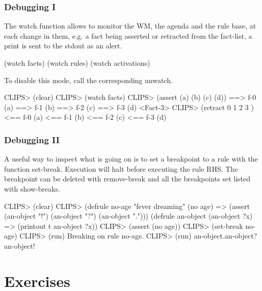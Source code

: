 \documentclass[xcolor={usenames,dvipsnames,svgnames}, compress]{beamer}
\begin{document}
\begin{frame}[fragile]
  \frametitle{Debugging I}
  The \textsf{watch} function allows to monitor the WM, the agenda and the
  rule base, at each change in them, e.g. a fact being asserted or
  retracted from the \textsf{fact-list}, a print is sent to the stdout
  as an alert.
  \begin{clips-code}[numbers=none]
    (watch facts)    (watch rules)    (watch activations)
  \end{clips-code}

  To disable this mode, call the corresponding \textsf{unwatch}.
  \begin{clips-code}
    CLIPS> (clear)
    CLIPS> (watch facts)
    CLIPS> (assert (a) (b) (c) (d))
    ==> f-0     (a)
    ==> f-1     (b)
    ==> f-2     (c)
    ==> f-3     (d)
    <Fact-3>
    CLIPS> (retract 0 1 2 3 )
    <== f-0     (a)
    <== f-1     (b)
    <== f-2     (c)
    <== f-3     (d)
  \end{clips-code}
\end{frame}

\begin{frame}[fragile]
  \frametitle{Debugging II}
  A useful way to inspect what is going on is to set a breakpoint to a
  rule with the function \textsf{set-break}. Execution will halt
  before executing the rule RHS. The breakpoint can be deleted with
  \textsf{remove-break} and all the breakpoints set listed with
  \textsf{show-breaks}.
  \begin{clips-code}
    CLIPS> (clear)
    CLIPS> (defrule no-age
               "fever dreaming"
               (no age)
               =>
               (assert (an-object "!") (an-object "?") (an-object
               ".")))
           (defrule an-object
               (an-object ?x)
               =>
               (printout t an-object ?x))
   CLIPS> (assert (no age))
   CLIPS> (set-break no-age)
   CLIPS> (run)
   Breaking on rule no-age.
   CLIPS> (run)
   an-object.an-object?an-object!
  \end{clips-code}
\end{frame}

\section{ Exercises}
{
  \begin{frame}
    \sectionpage
  \end{frame}
}
\end{document}
